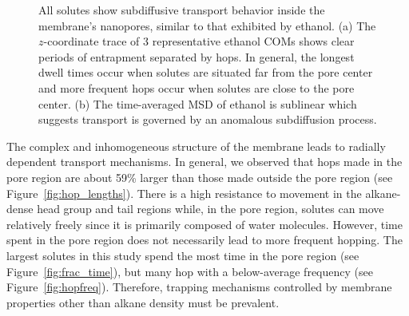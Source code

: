 \documentclass[journal=jpcbfk,manuscript=article]{achemso}
\begin{document}
\begin{figure}[!htb]
\begin{subfigure}{0.49\textwidth}
  \caption{}\label{fig:example_msd}
  \end{subfigure}
  \caption{All solutes show subdiffusive transport behavior inside the membrane's
  nanopores, similar to that exhibited by ethanol. (a) The $z$-coordinate trace of
  3 representative ethanol COMs shows clear periods of entrapment separated by hops.
  In general, the longest dwell times occur when solutes are situated far from the
  pore center and more frequent hops occur when solutes are close to the pore center.
  (b) The time-averaged MSD of ethanol is sublinear which suggests transport is
  governed by an anomalous subdiffusion process.}\label{fig:qualitative_mechanisms}
  \end{figure}
  
  The complex and inhomogeneous structure of the membrane leads to radially
  dependent transport mechanisms. In general, we observed that hops 
  made in the pore region are about 59\% larger than those made outside
  the pore region (see Figure~\ref{fig:hop_lengths}). There is a high 
  resistance to movement in the alkane-dense head group and tail regions
  while, in the pore region, solutes can move relatively freely since it 
  is primarily composed of water molecules. However, time spent in the 
  pore region does not necessarily lead to more frequent hopping. The 
  largest solutes in this study spend the most time in the pore region
  (see Figure~\ref{fig:frac_time}), but many hop with a below-average
  frequency (see Figure~\ref{fig:hopfreq}). Therefore, trapping mechanisms
  controlled by membrane properties other than alkane density must be prevalent.

 
\end{document}
